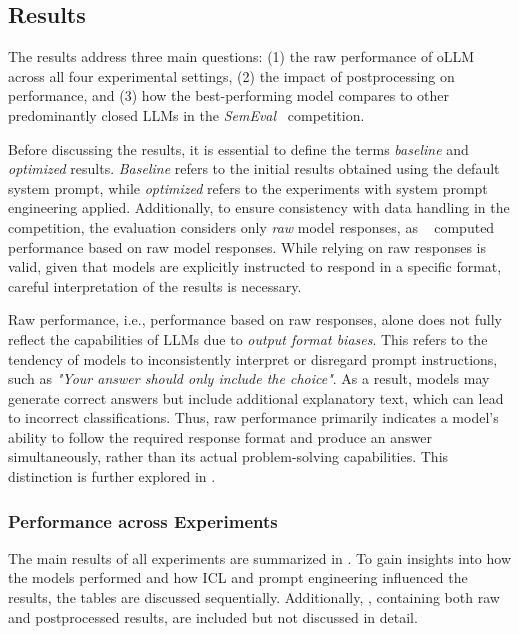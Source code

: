 \subsection{Results}

The results address three main questions: (1) the raw performance of \ac{oLLM} across all four experimental settings, (2) the impact of postprocessing on performance, and (3) how the best-performing model compares to other predominantly closed \acp{LLM} in the \textit{SemEval}~\cite{jiangSemEval2024Task92024} competition.

Before discussing the results, it is essential to define the terms \textit{baseline} and \textit{optimized} results. \textit{Baseline} refers to the initial results obtained using the default system prompt, while \textit{optimized} refers to the experiments with system prompt engineering applied. Additionally, to ensure consistency with data handling in the competition, the evaluation considers only \textit{raw} model responses, as \citeauthor{jiangBRAINTEASERLateralThinking2023}~\cite{jiangBRAINTEASERLateralThinking2023,jiangSemEval2024Task92024} computed performance based on raw model responses. While relying on raw responses is valid, given that models are explicitly instructed to respond in a specific format, careful interpretation of the results is necessary.

Raw performance, i.e., performance based on raw responses, alone does not fully reflect the capabilities of \acp{LLM} due to \textit{output format biases}. This refers to the tendency of models to inconsistently interpret or disregard prompt instructions, such as \textit{"Your answer should only include the choice"}. As a result, models may generate correct answers but include additional explanatory text, which can lead to incorrect classifications. Thus, raw performance primarily indicates a model's ability to follow the required response format and produce an answer simultaneously, rather than its actual problem-solving capabilities. This distinction is further explored in .

\subsubsection{Performance across Experiments}
\label{sec:performance-across-experiments}

The main results of all experiments are summarized in . To gain insights into how the models performed and how \ac{ICL} and prompt engineering influenced the results, the tables are discussed sequentially. Additionally, , containing both raw and postprocessed results, are included but not discussed in detail.

